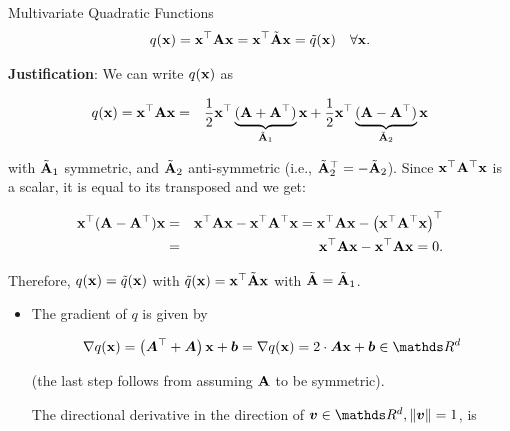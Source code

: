 \begin{vbframe}{Multivariate Quadratic Functions}
  \begin{eqnarray*}
    q(\mathbf{x}) = \mathbf{x}^\top \mathbf{A} \mathbf{x} = \mathbf{x}^\top \tilde {\mathbf{A}} \mathbf{x} = \tilde q(\mathbf{x}) \quad \forall \mathbf{x}.
  \end{eqnarray*}
  
  
  \textbf{Justification}: We can write $q(\mathbf{x})$ as
  
  \vspace*{-0.3cm}
  
  \begin{eqnarray*}
    q(\mathbf{x}) = \mathbf{x}^\top \mathbf{A} \mathbf{x} &=& \frac{1}{2} \mathbf{x}^\top \underbrace{(\mathbf{A} + \mathbf{A}^\top)}_{\tilde {\mathbf{A}}_1} \mathbf{x} + \frac{1}{2} \mathbf{x}^\top \underbrace{(\mathbf{A} - \mathbf{A}^\top)}_{\tilde {\mathbf{A}}_2} \mathbf{x}
  \end{eqnarray*}
  
  with $\tilde {\mathbf{A}}_1$ symmetric, and $\tilde {\mathbf{A}}_2$ anti-symmetric (i.e., $\tilde {\mathbf{A}}_2^\top = - \tilde {\mathbf{A}}_2$). Since $\mathbf{x}^\top \mathbf{A}^\top \mathbf{x}$ is a scalar, it is equal to its transposed and we get: 
  
  \vspace*{-0.3cm}
  
  \begin{eqnarray*}
     \mathbf{x}^\top (\mathbf{A} - \mathbf{A}^\top) \mathbf{x} &=&  \mathbf{x}^\top \mathbf{A} \mathbf{x} - \mathbf{x}^\top \mathbf{A}^\top \mathbf{x} =  \mathbf{x}^\top \mathbf{A} \mathbf{x} - \left(\mathbf{x}^\top \mathbf{A}^\top \mathbf{x}\right)^\top \\
     &=& \mathbf{x}^\top \mathbf{A} \mathbf{x} - \mathbf{x}^\top \mathbf{A} \mathbf{x}  = 0.
  \end{eqnarray*}
  
  Therefore, $q(\mathbf{x}) = \tilde q(\mathbf{x})$ with $\tilde q(\mathbf{x}) = \mathbf{x}^\top \tilde {\mathbf{A}} \mathbf{x}$ with $\tilde {\mathbf{A}} = \tilde {\mathbf{A}}_1$. 
  
  \framebreak 
  
  \begin{itemize}
    \item The gradient of $q$ is given by 
  
    \begin{eqnarray*}
      \nabla q(\xv) = \left(\bm{A}^\top + \bm{A}\right) \xv + \bm{b} = \nabla q(\xv) = 2 \cdot \bm{A} \xv + \bm{b} \in \R^d
    \end{eqnarray*}
  
    (the last step follows from assuming $\mathbf{A}$ to be symmetric). 
  
    \vspace*{0.2cm}
  
    The directional derivative in the direction of $\bm{v}\in \R^d, \|\bm{v}\| = 1$, is
  

\end{itemize}
\end{vbframe}
